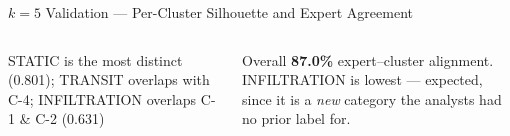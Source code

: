 \documentclass[aspectratio=169,10pt,t]{beamer}
\begin{document}
\begin{frame}{$k=5$ Validation --- Per-Cluster Silhouette and Expert Agreement}
\begin{columns}[T]
\begin{tl}\item STATIC is the most distinct (0.801); TRANSIT overlaps with C-4; INFILTRATION overlaps C-1 \& C-2 (0.631)\end{tl}
\begin{rbox}\scriptsize Overall \textbf{87.0\%} expert--cluster alignment. INFILTRATION is lowest --- expected, since it is a \emph{new} category the analysts had no prior label for.\end{rbox}
\end{columns}
\end{frame}
\end{document}
